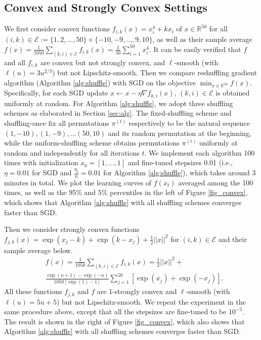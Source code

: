 \documentclass{article} %
\theoremstyle{plain}
\theoremstyle{definition}
\theoremstyle{remark}
\begin{document}
\subsection{Convex and Strongly Convex Settings}
We first consider convex functions $f_{i,k}(x)=x_i^4+kx_i$  of $x\in\mathbb{R}^{50}$ for all $(i,k)\in \mathcal{E}:=\{1,2,\ldots,50\}\times\{-10,-9,\ldots,9,10\}$, as well as their sample average $f(x)=\frac{1}{1050}\sum_{(k,i)\in\mathcal{E}}f_{i,k}(x)=\frac{1}{50}\sum_{i=1}^{50} x_i^4$. It can be easily verified that $f$ and all $f_{i,k}$ are convex but not strongly convex, and $\ell$-smooth (with $\ell(u)=3u^{2/3}$) but not Lipschitz-smooth. Then we compare reshuffling gradient algorithm (Algorithm \ref{alg:shuffle}) with SGD on the objective $\min_{x\in\mathbb{R}^{50}}f(x)$. Specifically, for each SGD update $x\leftarrow x-\eta\nabla f_{k,i}(x)$, $(k,i)\in\mathcal{E}$ is obtained uniformly at random. For Algorithm \ref{alg:shuffle}, we adopt three shuffling schemes as elaborated in Section \ref{sec:alg}. The fixed-shuffling scheme and shuffling-once fix all permutations $\pi^{(t)}$ respectively to be the natural sequence $(1,-10), (1,-9),\ldots (50,10)$ and its random permutation at the beginning, while the uniform-shuffling scheme obtains permutations $\pi^{(t)}$ uniformly at random and independently for all iterations $t$. We implement each algorithm 100 times with initialization $x_0=[1,\ldots,1]$ and fine-tuned stepsizes 0.01 (i.e., $\eta=0.01$ for SGD and $\frac{\eta_t}{n}=0.01$ for Algorithm \ref{alg:shuffle}), which takes around 3 minutes in total. We plot the learning curves of $f(x_t)$ averaged among the 100 times, as well as the 95\% and 5\% percentiles in the left of Figure \ref{fig_convex}, which shows that Algorithm \ref{alg:shuffle} with all shuffling schemes converges faster than SGD. 

Then we consider strongly convex functions $f_{j,k}(x)=\exp(x_j-k)+\exp(k-x_j)+\frac{1}{2}||x||^2$ for $(i,k)\in\mathcal{E}$ and their sample average below. 
\begin{align*}
    &f(x)=\frac{1}{1050}\sum_{(k,i)\in\mathcal{E}}f_{i,k}(x)=\frac{1}{2}||x||^2+\\
    &\frac{\exp(n+1)-\exp(-n)}{1050[\exp(1)-1]}\sum_{j=1}^{50} [\exp(x_j)+\exp(-x_j)].
\end{align*}
All these functions $f_{j,k}$ and $f$ are 1-strongly convex and $\ell$-smooth (with $\ell(u)=5u+5$) but not Lipschitz-smooth. We repeat the experiment in the same procedure above, except that all the stepsizes are fine-tuned to be $10^{-5}$. The result is shown in the right of Figure \ref{fig_convex}, which also shows that Algorithm \ref{alg:shuffle} with all shuffling schemes converges faster than SGD. 
\end{document}
